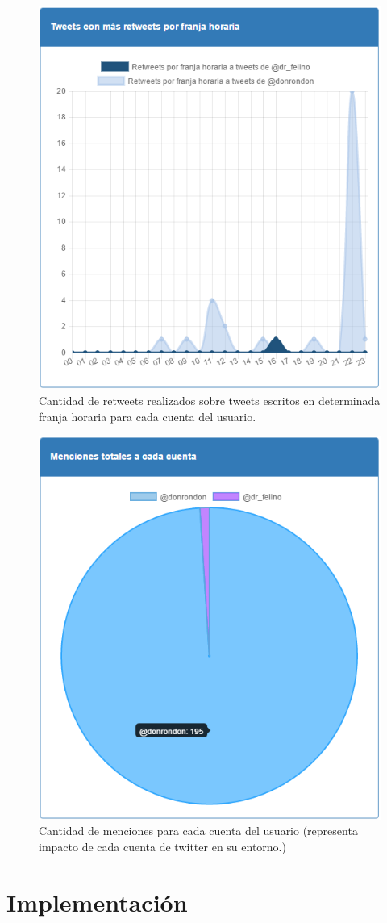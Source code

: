 \documentclass[a4paper]{article}
\begin{document}
			\begin{figure}[H]
				\centering
				\includegraphics[width=0.6\linewidth]{img/retweetsHoras}
				\caption{Cantidad de retweets realizados sobre tweets escritos en determinada franja horaria para cada cuenta del usuario.}
				\label{fig:retweetsHoras}
			\end{figure}
			
			\begin{figure}[H]
				\centering
				\includegraphics[width=0.6\linewidth]{img/mencionesCuentas}
				\caption{Cantidad de menciones para cada cuenta del usuario (representa impacto de cada cuenta de twitter en su entorno.)}
				\label{fig:mencionesCuentas}
			\end{figure}

\section{Implementación}
\end{document}
